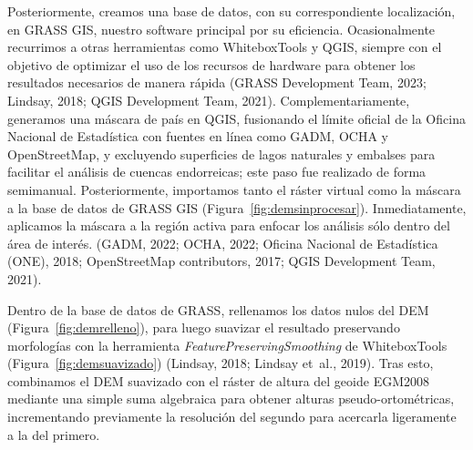 \documentclass[spanish]{article}
\begin{document}
Posteriormente, creamos una base de datos, con su correspondiente
localización, en GRASS GIS, nuestro software principal por su
eficiencia. Ocasionalmente recurrimos a otras herramientas como
WhiteboxTools y QGIS, siempre con el objetivo de optimizar el uso de los
recursos de hardware para obtener los resultados necesarios de manera
rápida (GRASS Development Team, 2023; Lindsay, 2018; QGIS Development
Team, 2021). Complementariamente, generamos una máscara de país en QGIS,
fusionando el límite oficial de la Oficina Nacional de Estadística con
fuentes en línea como GADM, OCHA y OpenStreetMap, y excluyendo
superficies de lagos naturales y embalses para facilitar el análisis de
cuencas endorreicas; este paso fue realizado de forma semimanual.
Posteriormente, importamos tanto el ráster virtual como la máscara a la
base de datos de GRASS GIS (Figura~\ref{fig:demsinprocesar}).
Inmediatamente, aplicamos la máscara a la región activa para enfocar los
análisis sólo dentro del área de interés. (GADM, 2022; OCHA, 2022;
Oficina Nacional de Estadística (ONE), 2018; OpenStreetMap contributors,
2017; QGIS Development Team, 2021).

Dentro de la base de datos de GRASS, rellenamos los datos nulos del DEM
(Figura~\ref{fig:demrelleno}), para luego suavizar el resultado
preservando morfologías con la herramienta
\emph{FeaturePreservingSmoothing} de WhiteboxTools
(Figura~\ref{fig:demsuavizado}) (Lindsay, 2018; Lindsay et~al., 2019).
Tras esto, combinamos el DEM suavizado con el ráster de altura del
geoide EGM2008 mediante una simple suma algebraica para obtener alturas
pseudo-ortométricas, incrementando previamente la resolución del segundo
para acercarla ligeramente a la del primero.
\end{document}
